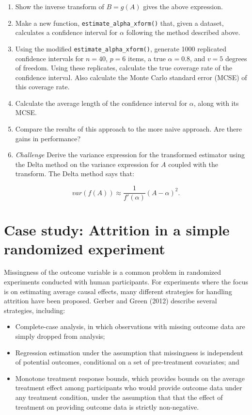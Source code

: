 \documentclass[
]{book}
\providecommand{\tightlist}{%
  \setlength{\itemsep}{0pt}\setlength{\parskip}{0pt}}
\begin{document}
\begin{enumerate}
\def\labelenumi{\arabic{enumi}.}
\item
  Show the inverse transform of \(B = g(A)\) gives the above expression.
\item
  Make a new function, \texttt{estimate\_alpha\_xform()} that, given a dataset, calculates a confidence interval for \(\alpha\) following the method described above.
\item
  Using the modified \texttt{estimate\_alpha\_xform()}, generate 1000 replicated confidence intervals for \(n = 40\), \(p = 6\) items, a true \(\alpha = 0.8\), and \(v = 5\) degrees of freedom. Using these replicates, calculate the true coverage rate of the confidence interval. Also calculate the Monte Carlo standard error (MCSE) of this coverage rate.
\item
  Calculate the average length of the confidence interval for \(\alpha\), along with its MCSE.
\item
  Compare the results of this approach to the more naive approach. Are there gains in performance?
\item
  \emph{Challenge} Derive the variance expression for the transformed estimator using the Delta method on the variance expression for \(A\) coupled with the transform. The Delta method says that:
\end{enumerate}

\[ var( f(A) ) \approx \frac{1}{f'(\alpha)} (A - \alpha)^2 . \]

\chapter{Case study: Attrition in a simple randomized experiment}\label{case-study-attrition-in-a-simple-randomized-experiment}

Missingness of the outcome variable is a common problem in randomized experiments conducted with human participants. For experiments where the focus is on estimating average causal effects, many different strategies for handling attrition have been proposed. Gerber and Green (2012) describe several strategies, including:

\begin{itemize}
\tightlist
\item
  Complete-case analysis, in which observations with missing outcome data are simply dropped from analysis;
\item
  Regression estimation under the assumption that missingness is independent of potential outcomes, conditional on a set of pre-treatment covariates; and
\item
  Monotone treatment response bounds, which provides bounds on the average treatment effect among participants who would provide outcome data under any treatment condition, under the assumption that that the effect of treatment on providing outcome data is strictly non-negative.
\end{itemize}
\end{document}

